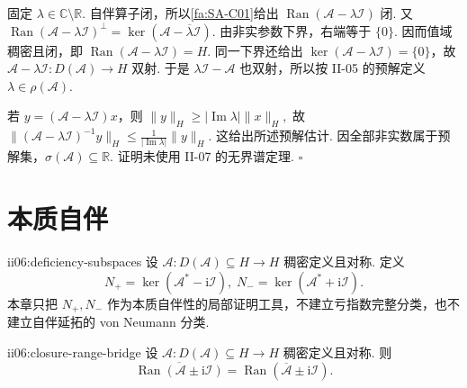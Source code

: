 \begin{FAProof}
固定 \(\displaystyle\lambda\in\mathbb C\setminus\mathbb R\). 自伴算子闭，所以\autoref{fa:SA-C01}给出 \(\displaystyle\operatorname{Ran}(\mathcal A-\lambda\mathcal I)\) 闭. 又
\(\displaystyle \operatorname{Ran}(\mathcal A-\lambda\mathcal I)^\perp = \ker(\mathcal A-\overline\lambda\mathcal I).\)
由非实参数下界，右端等于 \(\displaystyle\{0\}\). 因而值域稠密且闭，即
\(\displaystyle \operatorname{Ran}(\mathcal A-\lambda\mathcal I)=H.\)
同一下界还给出 \(\displaystyle\ker(\mathcal A-\lambda\mathcal I)=\{0\}\)，故 \(\displaystyle\mathcal A-\lambda\mathcal I:D(\mathcal A)\to H\) 双射. 于是 \(\displaystyle\lambda\mathcal I-\mathcal A\) 也双射，所以按 II-05 的预解定义 \(\displaystyle\lambda\in\rho(\mathcal A)\).

若 \(\displaystyle y=(\mathcal A-\lambda\mathcal I)x\)，则
\(\displaystyle \|y\|_H \geqslant |\operatorname{Im}\lambda|\|x\|_H,\)
故
\(\displaystyle \|(\mathcal A-\lambda\mathcal I)^{-1}y\|_H \leqslant \frac{1}{|\operatorname{Im}\lambda|}\|y\|_H.\)
这给出所述预解估计. 因全部非实数属于预解集，\(\displaystyle\sigma(\mathcal A)\subseteq\mathbb R\). 证明未使用 II-07 的无界谱定理.
\hfill\(\square\)
\end{FAProof}

\section{本质自伴}\label{sec:ii06-essential-selfadjoint}

\begin{FADefinition}[B][亏子空间]{ii06:deficiency-subspaces}
设 \(\displaystyle\mathcal A:D(\mathcal A)\subseteq H\to H\) 稠密定义且对称. 定义
\[
N_+
=
\ker(\mathcal A^*-\mathrm{i}\mathcal I),
\;
N_-
=
\ker(\mathcal A^*+\mathrm{i}\mathcal I).
\]
本章只把 \(\displaystyle N_+,N_-\) 作为本质自伴性的局部证明工具，不建立亏指数完整分类，也不建立自伴延拓的 von Neumann 分类.
\end{FADefinition}

\begin{FAProposition}[B][闭包与非实值域的桥梁]{ii06:closure-range-bridge}
设 \(\displaystyle\mathcal A:D(\mathcal A)\subseteq H\to H\) 稠密定义且对称. 则
\[
\overline{\operatorname{Ran}(\mathcal A\pm\mathrm{i}\mathcal I)}
=
\operatorname{Ran}(\overline{\mathcal A}\pm\mathrm{i}\mathcal I).
\]
\end{FAProposition}

